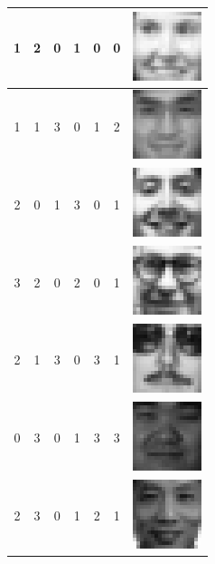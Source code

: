 \begin{itemize}
{\begin{longtable}{c|c|c|c|c|c|c}
\hline
1& 2& 0 & 1 &0 & 0 &  \includegraphics{FacesDay1/figs/face1180.png} \\
\hline
1& 1& 3 & 0 & 1 & 2 &  \includegraphics{FacesDay1/figs/face1260.png} \\
\hline
2 & 0 & 1 & 3 & 0 & 1 &  \includegraphics{FacesDay1/figs/face1270.png} \\
\hline
3 & 2 & 0 & 2 & 0 & 1 &  \includegraphics{FacesDay1/figs/face0960.png}  \\
\hline
2 & 1 & 3 & 0 & 3 & 1 &  \includegraphics{FacesDay1/figs/face0160.png}  \\
\hline
0 & 3 & 0 & 1 & 3 & 3 &  \includegraphics{FacesDay1/figs/face0615.png}  \\
\hline
2 & 3 & 0 & 1 & 2 & 1 &  \includegraphics{FacesDay1/figs/face0250.png} 
\end{longtable}}

\end{itemize}
